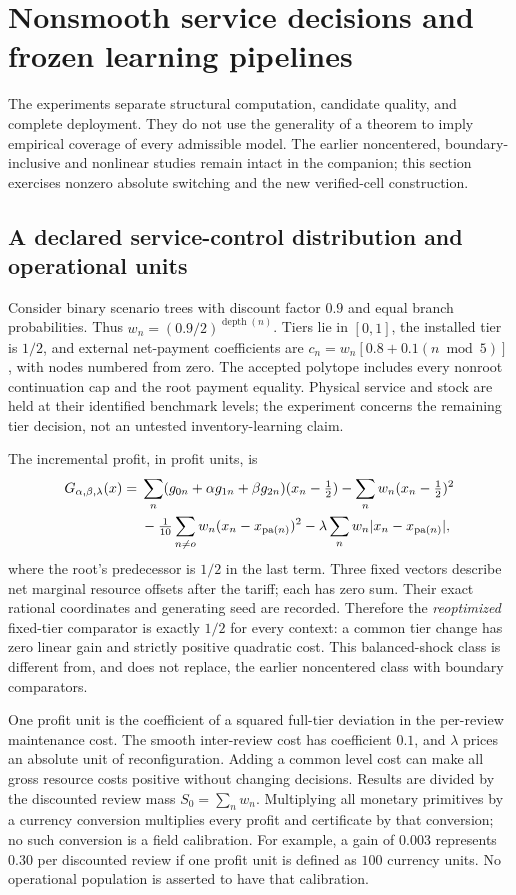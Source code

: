 \section{Nonsmooth service decisions and frozen learning pipelines}\label{sec:r13-experiment}
The experiments separate structural computation, candidate quality, and complete deployment. They do not use the generality of a theorem to imply empirical coverage of every admissible model. The earlier noncentered, boundary-inclusive and nonlinear studies remain intact in the companion; this section exercises nonzero absolute switching and the new verified-cell construction.

\subsection{A declared service-control distribution and operational units}
Consider binary scenario trees with discount factor $0.9$ and equal branch probabilities. Thus $w_n=(0.9/2)^{\operatorname{depth}(n)}$. Tiers lie in $[0,1]$, the installed tier is $1/2$, and external net-payment coefficients are $c_n=w_n[0.8+0.1(n\bmod5)]$, with nodes numbered from zero. The accepted polytope includes every nonroot continuation cap and the root payment equality. Physical service and stock are held at their identified benchmark levels; the experiment concerns the remaining tier decision, not an untested inventory-learning claim.

The incremental profit, in profit units, is
\begin{align}\label{eq:r13-data-objective}
 G_{\alpha,\beta,\lambda}(x)={}&\sum_n(g_{0n}+\alpha g_{1n}+\beta g_{2n})(x_n-\tfrac12)
             -\sum_n w_n(x_n-\tfrac12)^2\notag\\
 &-\tfrac1{10}\sum_{n\ne o}w_n(x_n-x_{\operatorname{pa}(n)})^2
             -\lambda\sum_n w_n|x_n-x_{\operatorname{pa}(n)}|,
\end{align}
where the root's predecessor is $1/2$ in the last term. Three fixed vectors describe net marginal resource offsets after the tariff; each has zero sum. Their exact rational coordinates and generating seed are recorded. Therefore the \emph{reoptimized} fixed-tier comparator is exactly $1/2$ for every context: a common tier change has zero linear gain and strictly positive quadratic cost. This balanced-shock class is different from, and does not replace, the earlier noncentered class with boundary comparators.

One profit unit is the coefficient of a squared full-tier deviation in the per-review maintenance cost. The smooth inter-review cost has coefficient $0.1$, and $\lambda$ prices an absolute unit of reconfiguration. Adding a common level cost can make all gross resource costs positive without changing decisions. Results are divided by the discounted review mass $S_0=\sum_n w_n$. Multiplying all monetary primitives by a currency conversion multiplies every profit and certificate by that conversion; no such conversion is a field calibration. For example, a gain of $0.003$ represents $0.30$ per discounted review if one profit unit is defined as $100$ currency units. No operational population is asserted to have that calibration.


